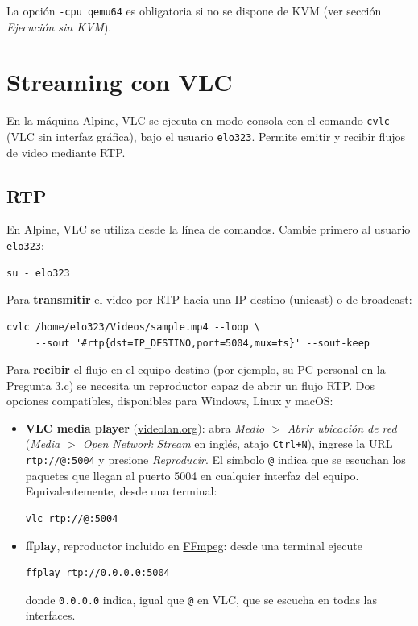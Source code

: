 \documentclass[letterpaper,12pt]{article}
\begin{document}
\begin{nota}
La opción \texttt{-cpu qemu64} es obligatoria si no se dispone de KVM (ver sección \textit{Ejecución sin KVM}).
\end{nota}

\section{Streaming con VLC}

En la máquina Alpine, VLC se ejecuta en modo consola con el comando \texttt{cvlc} (VLC sin interfaz gráfica), bajo el usuario \texttt{elo323}. Permite emitir y recibir flujos de video mediante RTP.

\subsection{RTP}

En Alpine, VLC se utiliza desde la línea de comandos. Cambie primero al usuario \texttt{elo323}:
\begin{lstlisting}
su - elo323
\end{lstlisting}

Para \textbf{transmitir} el video por RTP hacia una IP destino (unicast) o de broadcast:

\begin{lstlisting}
cvlc /home/elo323/Videos/sample.mp4 --loop \
     --sout '#rtp{dst=IP_DESTINO,port=5004,mux=ts}' --sout-keep
\end{lstlisting}

Para \textbf{recibir} el flujo en el equipo destino (por ejemplo, su PC personal en la Pregunta 3.c) se necesita un reproductor capaz de abrir un flujo RTP. Dos opciones compatibles, disponibles para Windows, Linux y macOS:

\begin{itemize}
    \item \textbf{VLC media player} (\href{https://www.videolan.org/vlc/}{videolan.org}): abra \textit{Medio $>$ Abrir ubicación de red} (\textit{Media $>$ Open Network Stream} en inglés, atajo \texttt{Ctrl+N}), ingrese la URL \texttt{rtp://@:5004} y presione \textit{Reproducir}. El símbolo \texttt{@} indica que se escuchan los paquetes que llegan al puerto 5004 en cualquier interfaz del equipo. Equivalentemente, desde una terminal:
\begin{lstlisting}
vlc rtp://@:5004
\end{lstlisting}
    \item \textbf{ffplay}, reproductor incluido en \href{https://ffmpeg.org/download.html}{FFmpeg}: desde una terminal ejecute
\begin{lstlisting}
ffplay rtp://0.0.0.0:5004
\end{lstlisting}
    donde \texttt{0.0.0.0} indica, igual que \texttt{@} en VLC, que se escucha en todas las interfaces.
\end{itemize}
\end{document}
